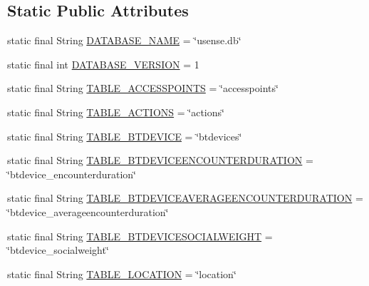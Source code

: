 \subsection*{Static Public Attributes}
\begin{DoxyCompactItemize}
\item 
static final String \hyperlink{classcs_1_1usense_1_1db_1_1_usense_s_q_lite_helper_a2b05849e264ee2718aa62fb120efe05d}{D\+A\+T\+A\+B\+A\+S\+E\+\_\+\+N\+A\+M\+E} = \char`\"{}usense.\+db\char`\"{}
\item 
static final int \hyperlink{classcs_1_1usense_1_1db_1_1_usense_s_q_lite_helper_a10d23e48686e6e07dddb05b650b2fda7}{D\+A\+T\+A\+B\+A\+S\+E\+\_\+\+V\+E\+R\+S\+I\+O\+N} = 1
\item 
static final String \hyperlink{classcs_1_1usense_1_1db_1_1_usense_s_q_lite_helper_a910d6881a7b8f78af64133aaa680c767}{T\+A\+B\+L\+E\+\_\+\+A\+C\+C\+E\+S\+S\+P\+O\+I\+N\+T\+S} = \char`\"{}accesspoints\char`\"{}
\item 
static final String \hyperlink{classcs_1_1usense_1_1db_1_1_usense_s_q_lite_helper_aca2589c9a7c772b25c1943554027e47a}{T\+A\+B\+L\+E\+\_\+\+A\+C\+T\+I\+O\+N\+S} = \char`\"{}actions\char`\"{}
\item 
static final String \hyperlink{classcs_1_1usense_1_1db_1_1_usense_s_q_lite_helper_a0badb79aafba332f23c5e5e00a58e5c3}{T\+A\+B\+L\+E\+\_\+\+B\+T\+D\+E\+V\+I\+C\+E} = \char`\"{}btdevices\char`\"{}
\item 
static final String \hyperlink{classcs_1_1usense_1_1db_1_1_usense_s_q_lite_helper_a97c1a24a98e051f656761705264f03d6}{T\+A\+B\+L\+E\+\_\+\+B\+T\+D\+E\+V\+I\+C\+E\+E\+N\+C\+O\+U\+N\+T\+E\+R\+D\+U\+R\+A\+T\+I\+O\+N} = \char`\"{}btdevice\+\_\+encounterduration\char`\"{}
\item 
static final String \hyperlink{classcs_1_1usense_1_1db_1_1_usense_s_q_lite_helper_a856b1ec01fbea78f2252e227c0324713}{T\+A\+B\+L\+E\+\_\+\+B\+T\+D\+E\+V\+I\+C\+E\+A\+V\+E\+R\+A\+G\+E\+E\+N\+C\+O\+U\+N\+T\+E\+R\+D\+U\+R\+A\+T\+I\+O\+N} = \char`\"{}btdevice\+\_\+averageencounterduration\char`\"{}
\item 
static final String \hyperlink{classcs_1_1usense_1_1db_1_1_usense_s_q_lite_helper_a3117177181b1ec57cc8a354b61a798ac}{T\+A\+B\+L\+E\+\_\+\+B\+T\+D\+E\+V\+I\+C\+E\+S\+O\+C\+I\+A\+L\+W\+E\+I\+G\+H\+T} = \char`\"{}btdevice\+\_\+socialweight\char`\"{}
\item 
static final String \hyperlink{classcs_1_1usense_1_1db_1_1_usense_s_q_lite_helper_a69aa67c207caf3faf97265f325070f3f}{T\+A\+B\+L\+E\+\_\+\+L\+O\+C\+A\+T\+I\+O\+N} = \char`\"{}location\char`\"{}

\end{DoxyCompactItemize}
